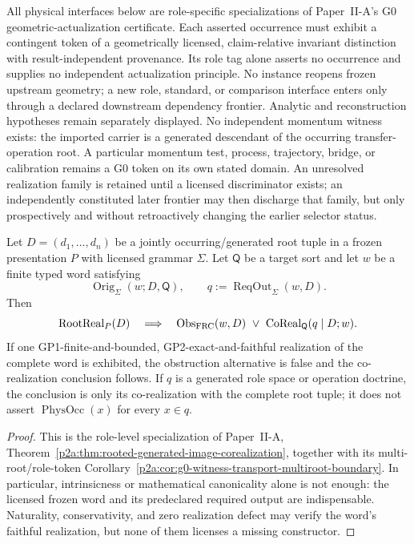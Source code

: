 \documentclass[12pt,a4paper]{article}
\begin{document}
\begin{principle}
\label{p3:g0-actualization}
All physical interfaces below are role-specific specializations of
Paper~II-A's G0 geometric-actualization certificate.  Each asserted occurrence
must exhibit a contingent token of a geometrically licensed, claim-relative
invariant distinction with result-independent provenance.  Its role tag alone
asserts no occurrence and supplies no independent actualization principle.
No instance reopens frozen upstream geometry; a new role, standard, or
comparison interface enters only through a declared downstream dependency
frontier.  Analytic and reconstruction hypotheses remain separately displayed.
No independent momentum witness exists: the imported carrier is a generated
descendant of the occurring transfer-operation root.  A particular momentum
test, process, trajectory, bridge, or calibration remains a G0 token on its
own stated domain.  An unresolved realization family is retained until a
licensed discriminator exists; an independently constituted later frontier may
then discharge that family, but only prospectively and without retroactively
changing the earlier selector status.
\end{principle}

\begin{lemma}
\label{p3a:lem:generated-role-occurrence-inheritance}
Let \(D=(d_1,\ldots,d_n)\) be a jointly occurring/generated root tuple in a
frozen presentation \(P\) with licensed grammar \(\Sigma\).  Let
\(\mathsf Q\) be a target sort and let \(w\) be a finite typed word satisfying
\[
 \operatorname{Orig}_{\Sigma}(w;D,\mathsf Q),
 \qquad q:=\operatorname{ReqOut}_{\Sigma}(w,D).
\]
Then
\[
 \operatorname{RootReal}_{P}(D)
 \quad\Longrightarrow\quad
 \operatorname{Obs}_{\rm FRC}(w,D)
 \ \vee\
 \operatorname{CoReal}_{\mathsf Q}(q\mid D;w).
\]
If one GP1-finite-and-bounded, GP2-exact-and-faithful realization of the
complete word is exhibited, the obstruction alternative is false and the
co-realization conclusion follows.
If \(q\) is a generated role space or operation doctrine, the conclusion is
only its co-realization with the complete root tuple; it does not assert
\(\operatorname{PhysOcc}(x)\) for every \(x\in q\).
\end{lemma}

\begin{proof}
This is the role-level specialization of
Paper~II-A,
Theorem~\ref{p2a:thm:rooted-generated-image-corealization}, together with
its multi-root/role-token
Corollary~\ref{p2a:cor:g0-witness-transport-multiroot-boundary}.  In
particular, intrinsicness or mathematical canonicality alone is not enough:
the licensed frozen word and its predeclared required output are indispensable.
Naturality, conservativity, and zero realization defect may verify the word's
faithful realization, but none of them licenses a missing constructor.
\end{proof}
\end{document}
